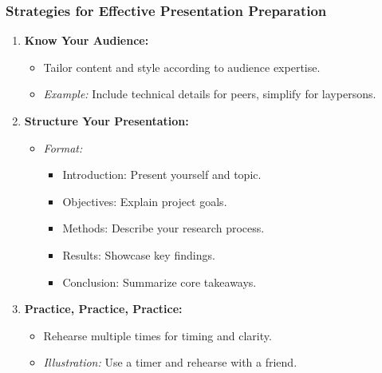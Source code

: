 \documentclass[aspectratio=169]{beamer}
\begin{document}
\begin{frame}[fragile]
  \frametitle{Strategies for Effective Presentation Preparation}

  \begin{enumerate}
      \item \textbf{Know Your Audience:}
      \begin{itemize}
          \item Tailor content and style according to audience expertise.
          \item \textit{Example:} Include technical details for peers, simplify for laypersons.
      \end{itemize}

      \item \textbf{Structure Your Presentation:}
      \begin{itemize}
          \item \textit{Format:}
          \begin{itemize}
              \item Introduction: Present yourself and topic.
              \item Objectives: Explain project goals.
              \item Methods: Describe your research process.
              \item Results: Showcase key findings.
              \item Conclusion: Summarize core takeaways.
          \end{itemize}
      \end{itemize}

      \item \textbf{Practice, Practice, Practice:}
      \begin{itemize}
          \item Rehearse multiple times for timing and clarity.
          \item \textit{Illustration:} Use a timer and rehearse with a friend.
      \end{itemize}
  \end{enumerate}
\end{frame}
\end{document}
